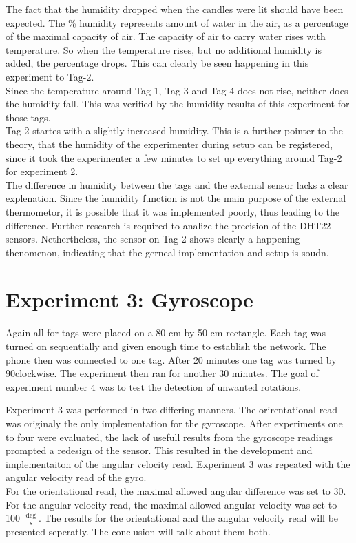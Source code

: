 The fact that the humidity dropped when the candles were lit should have been expected.
The \% humidity represents amount of water in the air, as a percentage of the maximal capacity of air.
The capacity of air to carry water rises with temperature.
So when the temperature rises, but no additional humidity is added, the percentage drops.
This can clearly be seen happening in this experiment to Tag-2.\\
Since the temperature around Tag-1, Tag-3 and Tag-4 does not rise, neither does the humidity fall.
This was verified by the humidity results of this experiment for those tags.\\
Tag-2 startes with a slightly increased humidity.
This is a further pointer to the theory, that the humidity of the experimenter during setup can be registered, since it took the experimenter a few minutes to set up everything around Tag-2 for experiment 2. \\
The difference in humidity between the tags and the external sensor lacks a clear explenation.
Since the humidity function is not the main purpose of the external thermometor, it is possible that it was implemented poorly, thus leading to the difference.
Further research is required to analize the precision of the DHT22 sensors.
Nethertheless, the sensor on Tag-2 shows clearly a happening thenomenon, indicating that the gerneal implementation and setup is soudn.



\section{Experiment 3: Gyroscope}
\label{s:exp_3}
Again all for tags were placed on a 80 cm by 50 cm rectangle.
Each tag was turned on sequentially and given enough time to establish the network.
The phone then was connected to one tag.
After 20 minutes one tag was turned by 90\degree clockwise.
The experiment then ran for another 30 minutes.
The goal of experiment number 4 was to test the detection of unwanted rotations.


Experiment 3 was performed in two differing manners.
The orirentational read was originaly the only implementation for the gyroscope.
After experiments one to four were evaluated, the lack of usefull results from the gyroscope readings prompted a redesign of the sensor.
This resulted in the development and implementaiton of the angular velocity read.
Experiment 3 was repeated with the angular velocity read of the gyro.\\
For the orientational read, the maximal allowed angular difference was set to 30\degree.
For the angular velocity read, the maximal allowed angular velocity was set to 100 $\frac{\deg}{s}$.
The results for the orientational and the angular velocity read will be presented seperatly. The conclusion will talk about them both.



